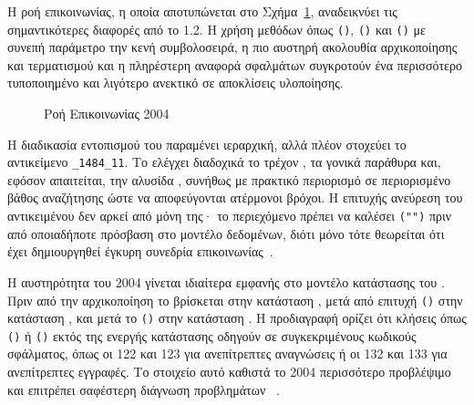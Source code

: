 \begin{table}[htbp]
\centering
\caption{Μέθοδοι  2004 }
\label{tab:scorm2004_api_methods}

\end{table}

Η ροή επικοινωνίας, η οποία αποτυπώνεται στο Σχήμα~\ref{fig:scorm2004_api_flow}, αναδεικνύει τις σημαντικότερες διαφορές από το  1.2. Η χρήση μεθόδων όπως \texttt{()}, \texttt{()} και \texttt{()} με συνεπή παράμετρο την κενή συμβολοσειρά, η πιο αυστηρή ακολουθία αρχικοποίησης και τερματισμού και η πληρέστερη αναφορά σφαλμάτων συγκροτούν ένα  περισσότερο τυποποιημένο και λιγότερο ανεκτικό σε αποκλίσεις υλοποίησης.

\begin{figure}[htbp]
\centering

\caption{Ροή Επικοινωνίας  2004 }
\label{fig:scorm2004_api_flow}
\end{figure}

Η διαδικασία εντοπισμού του  παραμένει ιεραρχική, αλλά πλέον στοχεύει το αντικείμενο \texttt{\_1484\_11}. Το  ελέγχει διαδοχικά το τρέχον , τα γονικά παράθυρα και, εφόσον απαιτείται, την αλυσίδα , συνήθως με πρακτικό περιορισμό σε περιορισμένο βάθος αναζήτησης ώστε να αποφεύγονται ατέρμονοι βρόχοι. Η επιτυχής ανεύρεση του αντικειμένου δεν αρκεί από μόνη της· το περιεχόμενο πρέπει να καλέσει \texttt{("")} πριν από οποιαδήποτε πρόσβαση στο μοντέλο δεδομένων, διότι μόνο τότε θεωρείται ότι έχει δημιουργηθεί έγκυρη συνεδρία επικοινωνίας~\cite{ADL_SCORM2004_RTE, Rustici_SCORM_API_Guide}.

Η αυστηρότητα του  2004 γίνεται ιδιαίτερα εμφανής στο μοντέλο κατάστασης του . Πριν από την αρχικοποίηση το  βρίσκεται στην κατάσταση , μετά από επιτυχή \texttt{()} στην κατάσταση , και μετά το \texttt{()} στην κατάσταση . Η προδιαγραφή ορίζει ότι κλήσεις όπως \texttt{()} ή \texttt{()} εκτός της ενεργής κατάστασης οδηγούν σε συγκεκριμένους κωδικούς σφάλματος, όπως οι 122 και 123 για ανεπίτρεπτες αναγνώσεις ή οι 132 και 133 για ανεπίτρεπτες εγγραφές. Το στοιχείο αυτό καθιστά το  2004 περισσότερο προβλέψιμο και επιτρέπει σαφέστερη διάγνωση προβλημάτων ~\cite{ADL_SCORM2004_RTE, SCORM_Error_Reference}.

